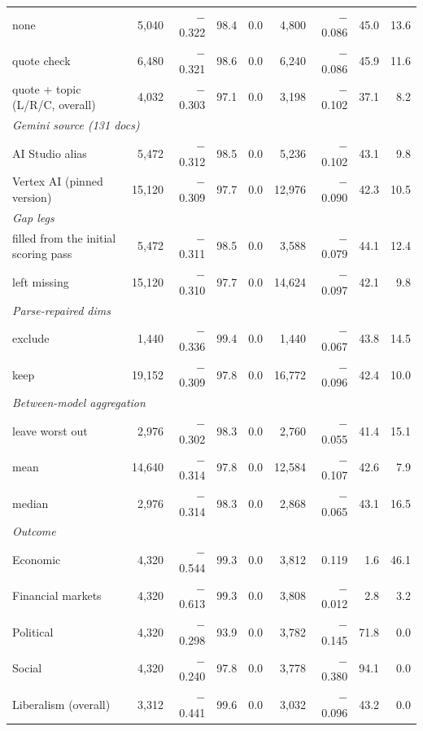 \begin{table}[ht]
{\begin{tabular}{lrrrrrrrr}
\quad none & 5,040 & $-$0.322 & 98.4 & 0.0 & 4,800 & $-$0.086 & 45.0 & 13.6 \\
\quad quote check & 6,480 & $-$0.321 & 98.6 & 0.0 & 6,240 & $-$0.086 & 45.9 & 11.6 \\
\quad quote + topic (L/R/C, overall) & 4,032 & $-$0.303 & 97.1 & 0.0 & 3,198 & $-$0.102 & 37.1 & 8.2 \\
\multicolumn{9}{l}{\emph{Gemini source (131 docs)}} \\
\quad AI Studio alias & 5,472 & $-$0.312 & 98.5 & 0.0 & 5,236 & $-$0.102 & 43.1 & 9.8 \\
\quad Vertex AI (pinned version) & 15,120 & $-$0.309 & 97.7 & 0.0 & 12,976 & $-$0.090 & 42.3 & 10.5 \\
\multicolumn{9}{l}{\emph{Gap legs}} \\
\quad filled from the initial scoring pass & 5,472 & $-$0.311 & 98.5 & 0.0 & 3,588 & $-$0.079 & 44.1 & 12.4 \\
\quad left missing & 15,120 & $-$0.310 & 97.7 & 0.0 & 14,624 & $-$0.097 & 42.1 & 9.8 \\
\multicolumn{9}{l}{\emph{Parse-repaired dims}} \\
\quad exclude & 1,440 & $-$0.336 & 99.4 & 0.0 & 1,440 & $-$0.067 & 43.8 & 14.5 \\
\quad keep & 19,152 & $-$0.309 & 97.8 & 0.0 & 16,772 & $-$0.096 & 42.4 & 10.0 \\
\multicolumn{9}{l}{\emph{Between-model aggregation}} \\
\quad leave worst out & 2,976 & $-$0.302 & 98.3 & 0.0 & 2,760 & $-$0.055 & 41.4 & 15.1 \\
\quad mean & 14,640 & $-$0.314 & 97.8 & 0.0 & 12,584 & $-$0.107 & 42.6 & 7.9 \\
\quad median & 2,976 & $-$0.314 & 98.3 & 0.0 & 2,868 & $-$0.065 & 43.1 & 16.5 \\
\multicolumn{9}{l}{\emph{Outcome}} \\
\quad Economic & 4,320 & $-$0.544 & 99.3 & 0.0 & 3,812 & 0.119 & 1.6 & 46.1 \\
\quad Financial markets & 4,320 & $-$0.613 & 99.3 & 0.0 & 3,808 & $-$0.012 & 2.8 & 3.2 \\
\quad Political & 4,320 & $-$0.298 & 93.9 & 0.0 & 3,782 & $-$0.145 & 71.8 & 0.0 \\
\quad Social & 4,320 & $-$0.240 & 97.8 & 0.0 & 3,778 & $-$0.380 & 94.1 & 0.0 \\
\quad Liberalism (overall) & 3,312 & $-$0.441 & 99.6 & 0.0 & 3,032 & $-$0.096 & 43.2 & 0.0 \\

\end{tabular}}
\end{table}
